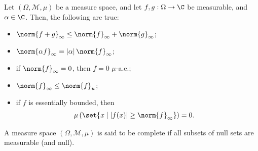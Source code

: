 \begin{fact}
  Let $\left(\Omega,\mathcal{M},\mu\right)$ be a measure space, and let $f,g: \Omega\rightarrow \C$ be measurable, and $\alpha \in \C$. Then, the following are true:
  \begin{itemize}
    \item $\displaystyle \norm{f+g}_{\infty}\leq \norm{f}_{\infty} + \norm{g}_{\infty}$;
    \item $\displaystyle \norm{\alpha f}_{\infty} = \left\vert \alpha \right\vert\norm{f}_{\infty}$;
    \item if $\displaystyle \norm{f}_{\infty} = 0$, then $f = 0$ $\mu$-a.e.;
    \item $\displaystyle \norm{f}_{\infty}\leq \norm{f}_{u}$;
    \item if $f$ is essentially bounded, then
      \begin{align*}
        \mu\left(\set{x\mid \left\vert f(x) \right\vert\geq \norm{f}_{\infty}}\right) &= 0.
      \end{align*}
  \end{itemize}
\end{fact}

\begin{definition}
A measure space $\left(\Omega,\mathcal{M},\mu\right)$ is said to be complete if all subsets of null sets are measurable (and null).
\end{definition}
